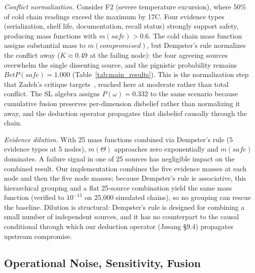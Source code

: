 \documentclass[conference]{IEEEtran}
\begin{document}
\textit{Conflict normalization.} Consider F2 (severe temperature
excursion), where 50\% of cold chain readings exceed the maximum by
17\textdegree C. Four evidence types (serialization, shelf life,
documentation, recall status) strongly support safety, producing mass
functions with $m(safe) > 0.6$. The cold chain mass function assigns
substantial mass to $m(compromised)$, but Dempster's rule normalizes the
conflict away ($K \approx 0.49$ at the failing node): the four agreeing
sources overwhelm the single dissenting source, and the pignistic
probability remains $BetP(safe) = 1.000$ (Table~\ref{tab:main_results}).
This is the normalization step that Zadeh's critique targets~\cite{zadeh1984},
reached here at moderate rather than total conflict. The SL algebra
assigns $P(\omega) = 0.332$ to the same scenario because cumulative fusion
preserves per-dimension disbelief rather than normalizing it away, and
the deduction operator propagates that disbelief causally through the
chain.

\textit{Evidence dilution.} With 25 mass functions combined via
Dempster's rule (5 evidence types at 5 nodes), $m(\Theta)$ approaches
zero exponentially and $m(safe)$ dominates. A failure signal in one of
25 sources has negligible impact on the combined result. Our
implementation combines the five evidence masses at each node and then
the five node masses; because Dempster's rule is associative, this
hierarchical grouping and a flat 25-source combination yield the same
mass function (verified to $10^{-15}$ on 25{,}000 simulated chains), so
no grouping can rescue the baseline. Dilution is structural: Dempster's
rule is designed for combining a small number of independent sources,
and it has no counterpart to the causal conditional through which our
deduction operator (J\o sang \S9.4) propagates upstream compromise.

\subsection{Operational Noise, Sensitivity, Fusion}
\label{sec:noise}
\end{document}
